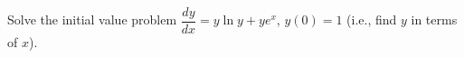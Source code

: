 Solve the initial value problem $\dfrac{dy}{dx} = y \ln y + y e^x$, $y(0) = 1$
(i.e., find $y$ in terms of $x$).
